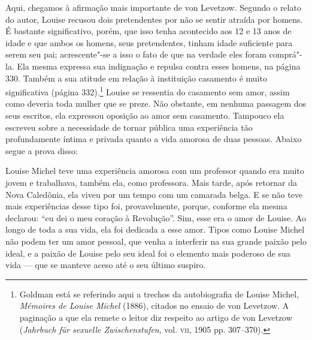 Aqui, chegamos à afirmação mais importante de von Levetzow. Segundo o
relato do autor, Louise recusou dois pretendentes por não se sentir
atraída por homens. É bastante significativo, porém, que isso tenha
acontecido aos 12 e 13 anos de idade e que ambos os homens, seus
pretendentes, tinham idade suficiente para serem seu pai; acrescente"-se
a isso o fato de que na verdade eles foram comprá"-la. Ela mesma expressa
sua indignação e repulsa contra esses homens, na página 330. Também a
sua atitude em relação à instituição casamento é muito significativa
(página 332).\footnote{Goldman está se referindo aqui a trechos da
  autobiografia de Louise Michel, \emph{Mémoires de Louise Michel}
  (1886), citados no ensaio de von Levetzow. A paginação a que ela
  remete o leitor diz respeito ao artigo de von Levetzow
  (\emph{Jahrbuch für sexuelle Zwischenstufen}, vol. \textsc{vii}, 1905 pp.
  307--370).} Louise se ressentia do casamento sem amor, assim como
deveria toda mulher que se preze. Não obstante, em nenhuma passagem dos
seus escritos, ela expressou oposição ao amor sem casamento. Tampouco
ela escreveu sobre a necessidade de tornar pública uma experiência tão
profundamente íntima e privada quanto a vida amorosa de duas pessoas.
Abaixo segue a prova disso:

Louise Michel teve uma experiência amorosa com um professor quando era
muito jovem e trabalhava, também ela, como professora. Mais tarde, após
retornar da Nova Caledônia, ela viveu por um tempo com um camarada
belga. E se não teve mais experiências desse tipo foi, provavelmente,
porque, conforme ela mesma declarou: ``eu dei o meu coração à
Revolução''. Sim, esse era o amor de Louise. Ao longo de toda a sua
vida, ela foi dedicada a esse amor. Tipos como Louise Michel não podem
ter um amor pessoal, que venha a interferir na sua grande
paixão pelo ideal, e a paixão de Louise pelo seu ideal foi o elemento
mais poderoso de sua vida --- que se manteve aceso até o seu último suspiro.

